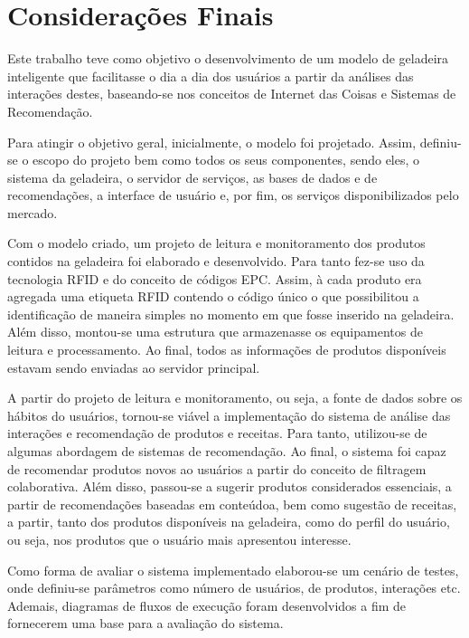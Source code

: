 \chapter{Considerações Finais}
\label{cap:consideracoes_finais}

Este trabalho teve como objetivo o desenvolvimento de um modelo de geladeira inteligente que facilitasse o dia a dia dos usuários a partir da análises das interações destes, baseando-se nos conceitos de Internet das Coisas e Sistemas de Recomendação.

Para atingir o objetivo geral, inicialmente, o modelo foi projetado. Assim, definiu-se o escopo do projeto bem como todos os seus componentes, sendo eles, o sistema da geladeira, o servidor de serviços, as bases de dados e de recomendações, a interface de usuário e, por fim, os serviços disponibilizados pelo mercado.

Com o modelo criado, um projeto de leitura e monitoramento dos produtos contidos na geladeira foi elaborado e desenvolvido. Para tanto fez-se uso da tecnologia RFID e do conceito de códigos EPC. Assim, à cada produto era agregada uma etiqueta RFID contendo o código único o que possibilitou a identificação de maneira simples no momento em que fosse inserido na geladeira. Além disso, montou-se uma estrutura que armazenasse os equipamentos de leitura e processamento. Ao final, todos as informações de produtos disponíveis estavam sendo enviadas ao servidor principal.

A partir do projeto de leitura e monitoramento, ou seja, a fonte de dados sobre os hábitos do usuários, tornou-se viável a implementação do sistema de análise das interações e recomendação de produtos e receitas. Para tanto, utilizou-se de algumas abordagem de sistemas de recomendação. Ao final, o sistema foi capaz de recomendar produtos novos ao usuários a partir do conceito de filtragem colaborativa. Além disso, passou-se a sugerir produtos considerados essenciais, a partir de recomendações baseadas em conteúdoa, bem como sugestão de receitas, a partir, tanto dos produtos disponíveis na geladeira, como do perfil do usuário, ou seja, nos produtos que o usuário mais apresentou interesse.

Como forma de avaliar o sistema implementado elaborou-se um cenário de testes, onde definiu-se parâmetros como número de usuários, de produtos, interações etc. Ademais, diagramas de fluxos de execução foram desenvolvidos a fim de fornecerem uma base para a avaliação do sistema.

